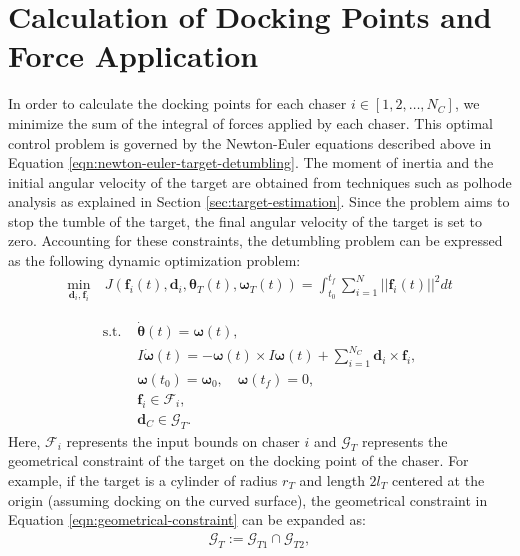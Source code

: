 \section{Calculation of Docking Points and Force Application}
In order to calculate the docking points for each chaser $i\in[1,2,\ldots,N_C]$, we minimize the sum of the integral of forces applied by each chaser. This optimal control problem is governed by the Newton-Euler equations described above in Equation \ref{eqn:newton-euler-target-detumbling}. The moment of inertia and the initial angular velocity of the target are obtained from techniques such as polhode analysis as explained in Section \ref{sec:target-estimation}. Since the problem aims to stop the tumble of the target, the final angular velocity of the target is set to zero. Accounting for these constraints, the detumbling problem can be expressed as the following dynamic optimization problem:
\begin{align}
    \min_{\boldsymbol{d}_{i},\boldsymbol{f}_{i}}\ &J\left(\boldsymbol{f}_{i}(t),\boldsymbol{d}_{i},\boldsymbol{\theta}_T(t), \boldsymbol{\omega}_T(t)\right) =\int_{t_0}^{t_f}\sum_{i=1}^N||\boldsymbol{f}_{i}(t)||^2dt
\end{align}
\addtocounter{equation}{-1}
\vspace{-4ex}
\begin{subequations}
\begin{align}
    \textrm{s.t. } & \dot{\boldsymbol{\theta}}(t)=\boldsymbol{\omega}(t),\\
    & I\dot{\boldsymbol{\omega}}(t)=-\boldsymbol{\omega}(t)\times I\boldsymbol{\omega}(t)+\sum_{i=1}^{N_C}\boldsymbol{d}_{i}\times\boldsymbol{f}_{i},\\
    & \boldsymbol{\omega}(t_0)=\boldsymbol{\omega}_0,\quad\boldsymbol{\omega}(t_f)=0,\\
    & \boldsymbol{f}_{i}\in{\mathcal{F}}_i,\\
    & \boldsymbol{d}_C\in{\mathcal{G}}_T. \label{eqn:geometrical-constraint}
\end{align}
\end{subequations}
Here, ${\mathcal{F}}_i$ represents the input bounds on chaser $i$ and ${\mathcal{G}}_T$ represents the geometrical constraint of the target on the docking point of the chaser. For example, if the target is a cylinder of radius $r_T$ and length $2l_T$ centered at the origin (assuming docking on the curved surface), the geometrical constraint in Equation \ref{eqn:geometrical-constraint} can be expanded as:
\begin{align}
    {\mathcal{G}}_T:={\mathcal{G}}_{T1}\cap{\mathcal{G}}_{T2},
\end{align}
